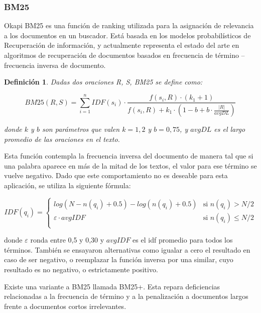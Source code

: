 \documentclass{llncs}
\newtheorem{definicion}{Definición}
\begin{document}
\subsubsection{BM25}
Okapi BM25 es una función de ranking utilizada para la asignación de relevancia a los documentos en un buscador. 
Está basada en los modelos probabilísticos de Recuperación de información, y actualmente 
representa el estado del arte en algoritmos de recuperación de documentos 
basados en frecuencia de término -- frecuencia inversa de documento.

\begin{definicion}
Dadas dos oraciones R, S, BM25 se define como:

\begin{equation}
BM25(R,S) = \sum_{i=1}^{n} IDF(s_i) \cdot \frac{f(s_i, R) \cdot (k_1 + 1)}{f(s_i, R) + k_1 \cdot (1 - b + b \cdot \frac{|R|}{avgDL})}
\end{equation}

donde $k$ y $b$ son parámetros que valen $k = 1,2$ y $b = 0,75$, y $avgDL$ es el largo promedio de las oraciones en el texto.
\end{definicion}

Esta función contempla la frecuencia inversa del documento de manera tal que si una palabra aparece en más de la mitad de los textos, el valor para ese término se vuelve negativo. Dado que este comportamiento no es deseable para esta aplicación, se utiliza la siguiente fórmula:
                
\begin{equation}
 IDF(q_i) =
  \begin{cases}
       log(N - n(q_i) + 0.5) - log(n(q_i) + 0.5)    & \text{si }  n(q_i) > N/2\\
       \varepsilon \cdot avgIDF                     & \text{si }  n(q_i) \leq N/2\\
  \end{cases}
\end{equation}                
                
donde $\varepsilon$ ronda entre 0,5 y 0,30 y $avgIDF$ es el idf promedio para todos los términos.
También se ensayaron alternativas como igualar a cero el resultado en caso de ser negativo, o reemplazar la función inversa por una similar, cuyo resultado es no negativo, o estrictamente positivo. 

Existe una variante a BM25 llamada BM25+. Esta repara deficiencias relacionadas a la frecuencia de término y a la penalización a documentos largos frente a documentos cortos irrelevantes.
\end{document}
